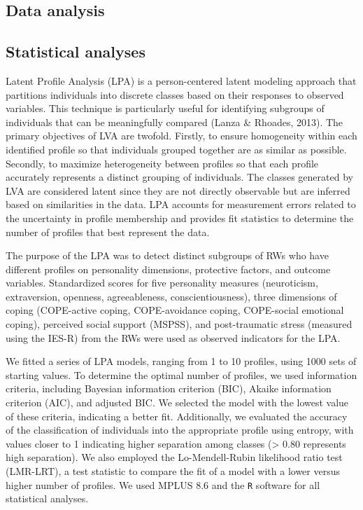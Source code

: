 \documentclass[
  man]{apa7}
\begin{document}
\hypertarget{data-analysis}{%
\subsection{Data analysis}\label{data-analysis}}

\hypertarget{statistical-analyses}{%
\subsection{Statistical analyses}\label{statistical-analyses}}

Latent Profile Analysis (LPA) is a person-centered latent modeling approach that partitions individuals into discrete classes based on their responses to observed variables. This technique is particularly useful for identifying subgroups of individuals that can be meaningfully compared (Lanza \& Rhoades, 2013). The primary objectives of LVA are twofold. Firstly, to ensure homogeneity within each identified profile so that individuals grouped together are as similar as possible. Secondly, to maximize heterogeneity between profiles so that each profile accurately represents a distinct grouping of individuals. The classes generated by LVA are considered latent since they are not directly observable but are inferred based on similarities in the data. LPA accounts for measurement errors related to the uncertainty in profile membership and provides fit statistics to determine the number of profiles that best represent the data.

The purpose of the LPA was to detect distinct subgroups of RWs who have different profiles on personality dimensions, protective factors, and outcome variables. Standardized scores for five personality measures (neuroticism, extraversion, openness, agreeableness, conscientiousness), three dimensions of coping (COPE-active coping, COPE-avoidance coping, COPE-social emotional coping), perceived social support (MSPSS), and post-traumatic stress (measured using the IES-R) from the RWs were used as observed indicators for the LPA.

We fitted a series of LPA models, ranging from 1 to 10 profiles, using 1000 sets of starting values. To determine the optimal number of profiles, we used information criteria, including Bayesian information criterion (BIC), Akaike information criterion (AIC), and adjusted BIC. We selected the model with the lowest value of these criteria, indicating a better fit. Additionally, we evaluated the accuracy of the classification of individuals into the appropriate profile using entropy, with values closer to 1 indicating higher separation among classes (\textgreater{} 0.80 represents high separation). We also employed the Lo-Mendell-Rubin likelihood ratio test (LMR-LRT), a test statistic to compare the fit of a model with a lower versus higher number of profiles. We used MPLUS 8.6 and the \texttt{R} software for all statistical analyses.
\end{document}
